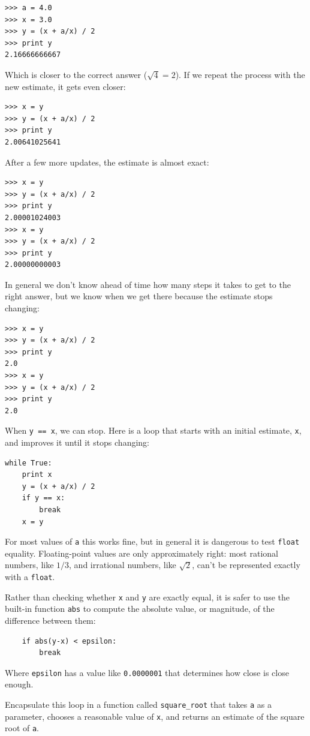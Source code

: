 \documentclass[10pt]{book}
\begin{document}
\begin{verbatim}
>>> a = 4.0
>>> x = 3.0
>>> y = (x + a/x) / 2
>>> print y
2.16666666667
\end{verbatim}
%
Which is closer to the correct answer ($\sqrt{4} = 2$).  If we
repeat the process with the new estimate, it gets even closer:

\begin{verbatim}
>>> x = y
>>> y = (x + a/x) / 2
>>> print y
2.00641025641
\end{verbatim}
%
After a few more updates, the estimate is almost exact:

\begin{verbatim}
>>> x = y
>>> y = (x + a/x) / 2
>>> print y
2.00001024003
>>> x = y
>>> y = (x + a/x) / 2
>>> print y
2.00000000003
\end{verbatim}
%
In general we don't know ahead of time how many steps it takes
to get to the right answer, but we know when we get there
because the estimate
stops changing:

\begin{verbatim}
>>> x = y
>>> y = (x + a/x) / 2
>>> print y
2.0
>>> x = y
>>> y = (x + a/x) / 2
>>> print y
2.0
\end{verbatim}
%
When {\tt y == x}, we can stop.  Here is a loop that starts
with an initial estimate, {\tt x}, and improves it until it
stops changing:

\begin{verbatim}
while True:
    print x
    y = (x + a/x) / 2
    if y == x:
        break
    x = y
\end{verbatim}
%
For most values of {\tt a} this works fine, but in general it is
dangerous to test {\tt float} equality.
Floating-point values are only approximately right:
most rational numbers, like $1/3$, and irrational numbers, like
$\sqrt{2}$, can't be represented exactly with a {\tt float}.

Rather than checking whether {\tt x} and {\tt y} are exactly equal, it
is safer to use the built-in function {\tt abs} to compute the
absolute value, or magnitude, of the difference between them:

\begin{verbatim}
    if abs(y-x) < epsilon:
        break
\end{verbatim}
%
Where \verb"epsilon" has a value like {\tt 0.0000001} that
determines how close is close enough.

\begin{exercise}

Encapsulate this loop in a function called \verb"square_root"
that takes {\tt a} as a parameter, chooses a reasonable
value of {\tt x}, and returns an estimate of the square root
of {\tt a}.

\end{exercise}
\end{document}
